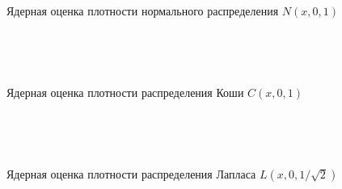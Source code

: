 \documentclass[12pt]{article}
\begin{document}
\begin{figure}[h!]
	\begin{center}
	\begin{minipage}[h]{0.6\linewidth}
	\end{minipage}
	\phantom{0}\\
	\begin{minipage}[h]{0.6\linewidth}
	\end{minipage}
	\phantom{0}\\
	\begin{minipage}[h]{0.6\linewidth}
	\end{minipage}
	\caption{Ядерная оценка плотности нормального распределения $N(x, 0, 1)$}
\end{center}
\end{figure}
\newpage
\begin{figure}[h!]
	\begin{center}
	\begin{minipage}[h]{0.65\linewidth}
	\end{minipage}
	\phantom{0}\\
	\begin{minipage}[h]{0.65\linewidth}
	\end{minipage}
	\phantom{0}\\
	\begin{minipage}[h]{0.65\linewidth}
	\end{minipage}
	\caption{Ядерная оценка плотности распределения Коши $C(x, 0, 1)$}
\end{center}
\end{figure}
\newpage\begin{figure}[h!]
	\begin{center}
	\begin{minipage}[h]{0.65\linewidth}
	\end{minipage}
	\phantom{0}\\
	\begin{minipage}[h]{0.65\linewidth}
	\end{minipage}
	\phantom{0}\\
	\begin{minipage}[h]{0.65\linewidth}
	\end{minipage}
	\caption{Ядерная оценка плотности распределения Лапласа $L(x, 0, 1/\sqrt{2})$}
\end{center}
\end{figure}
\end{document}
